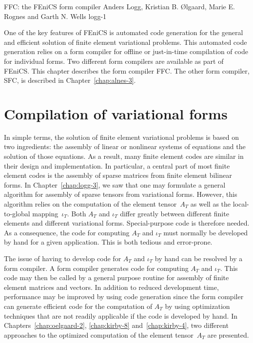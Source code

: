               {FFC: the FEniCS form compiler}
              {Anders Logg, Kristian B. \O{}lgaard, Marie E. Rognes and Garth N. Wells}
              {logg-1}


One of the key features of FEniCS is automated code generation for
the general and efficient solution of finite element variational
problems. This automated code generation relies on a form compiler for
offline or just-in-time compilation of code for individual forms. Two
different form compilers are available as part of FEniCS. This chapter
describes the form compiler FFC. The other form compiler, SFC, is
described in Chapter~\ref{chap:alnes-3}.


\section{Compilation of variational forms}

In simple terms, the solution of finite element variational problems
is based on two ingredients: the assembly of linear or nonlinear
systems of equations and the solution of those equations. As a result,
many finite element codes are similar in their design and
implementation. In particular, a central part of most finite element
codes is the assembly of sparse matrices from finite element bilinear
forms. In Chapter~\ref{chap:logg-3}, we saw that one may formulate a
general algorithm for assembly of sparse tensors from variational
forms. However, this algorithm relies on the computation of the
element tensor~$A_T$ as well as the local-to-global mapping~$\iota_T$.
Both $A_T$ and $\iota_T$ differ greatly between different finite
elements and different variational forms. Special-purpose code is
therefore needed. As a consequence, the code for computing $A_T$ and
$\iota_T$ must normally be developed by hand for a given
application. This is both tedious and error-prone.


The issue of having to develop code for $A_T$ and $\iota_T$ by hand
can be resolved by a form compiler. A form compiler generates code for
computing $A_T$ and $\iota_T$. This code may then be called by a
general purpose routine for assembly of finite element matrices and
vectors. In addition to reduced development time, performance may be
improved by using code generation since the form compiler can generate
efficient code for the computation of $A_T$ by using optimization
techniques that are not readily applicable if the code is developed by
hand. In Chapters~\ref{chap:oelgaard-2}, \ref{chap:kirby-8}
and~\ref{chap:kirby-4}, two different approaches to the optimized
computation of the element tensor~$A_T$ are presented.

